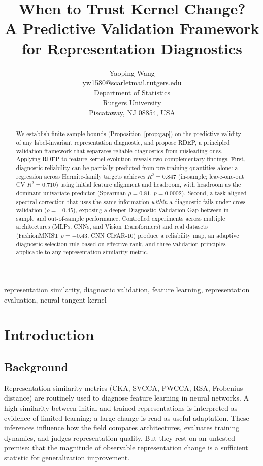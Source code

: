 \documentclass[twoside,11pt]{article}
\title{When to Trust Kernel Change?\\A Predictive Validation Framework for Representation Diagnostics}
\author{
  \name Yaoping Wang \\
  \email yw1580@scarletmail.rutgers.edu \\
  \addr Department of Statistics \\
  \addr Rutgers University \\
  \addr Piscataway, NJ 08854, USA
}
\begin{document}
\maketitle

\begin{abstract}
We establish finite-sample bounds (Proposition~\ref{prop:gap}) on the predictive validity of any label-invariant representation diagnostic, and propose RDEP, a principled validation framework that separates reliable diagnostics from misleading ones. Applying RDEP to feature-kernel evolution reveals two complementary findings. First, diagnostic reliability can be partially predicted from pre-training quantities alone: a regression across Hermite-family targets achieves $R^2=0.847$ (in-sample; leave-one-out CV $R^2=0.710$) using initial feature alignment and headroom, with headroom as the dominant univariate predictor (Spearman $\rho=0.81$, $p=0.0002$). Second, a task-aligned spectral correction that uses the same information \emph{within} a diagnostic fails under cross-validation ($\rho=-0.45$), exposing a deeper Diagnostic Validation Gap between in-sample and out-of-sample performance. Controlled experiments across multiple architectures (MLPs, CNNs, and Vision Transformers) and real datasets (FashionMNIST $\rho=-0.43$, CNN CIFAR-10) produce a reliability map, an adaptive diagnostic selection rule based on effective rank, and three validation principles applicable to any representation similarity metric.
\end{abstract}
\begin{keywords}
representation similarity, diagnostic validation, feature learning, representation evaluation, neural tangent kernel
\end{keywords}

\section{Introduction}
\label{sec:intro}

\subsection{Background}

Representation similarity metrics (CKA, SVCCA, PWCCA, RSA, Frobenius distance) are routinely used to diagnose feature learning in neural networks. A high similarity between initial and trained representations is interpreted as evidence of limited learning; a large change is read as useful adaptation. These inferences influence how the field compares architectures, evaluates training dynamics, and judges representation quality. But they rest on an untested premise: that the magnitude of observable representation change is a sufficient statistic for generalization improvement.
\end{document}
